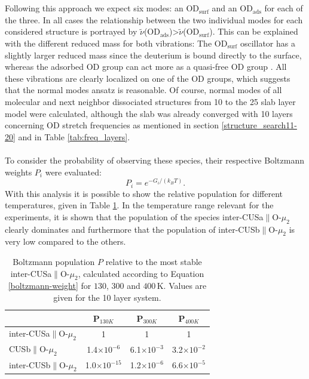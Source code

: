 \documentclass[11pt,DIV=13,BCOR=5mm,a4paper,headinclude]{scrbook}
\begin{document}
\\\\
 Following this approach we expect six modes: an OD$_\textrm{surf}$ and an OD$_\textrm{ads}$ for each of the three.
In all cases the relationship between the two individual modes for each considered structure is portrayed by $\tilde{\nu}$(OD$_\textrm{ads}$)>$\tilde{\nu}$(OD$_\textrm{surf}$).
This can be explained with the different reduced mass for both vibrations: The OD$_\textrm{surf}$ oscillator has a slightly larger reduced mass since the deuterium is bound directly to the surface, whereas the adsorbed OD group can act more as a quasi-free OD group \cite{Wirth2014}.
All these vibrations are clearly localized on one of the OD groups, which suggests that the normal modes ansatz is reasonable.
Of course, normal modes of all molecular and next neighbor dissociated structures from 10 to the 25 slab layer model were calculated, although the slab was already converged with 10 layers concerning OD stretch frequencies as mentioned in section \ref{structure_search11-20} and in Table \ref{tab:freq_layers}. 
\\
\\
To consider the probability of observing these species, their respective Boltzmann weights $P_i$ were evaluated:
\begin{equation}\label{boltzmann-weight}
 P_i=e^{-G_i/(k_BT)}.
\end{equation}
With this analysis it is possible to show the relative population for different temperatures, given in Table \ref{tab:boltzmann-pop}.
In the temperature range relevant for the experiments, it is shown that the population of the species inter-CUSa$\parallel$O-$\mu_2$ clearly dominates and furthermore that the population of inter-CUSb$\parallel$O-$\mu_2$ is very low compared to the others.
\begin{table}[th]
  \centering
 \caption{Boltzmann population $P$ relative to the most stable inter-CUSa$\parallel$O-$\mu_2$, calculated according to Equation \ref{boltzmann-weight} for $130$, $300$ and $400\,$K.
Values are given for the 10 layer system.}
\vspace*{.2cm} 
 \begin{tabular}{l|ccc}
 \toprule
  & P$_{130K}$ & P$_{300K}$ & P$_{400K}$\\\midrule
  inter-CUSa$\parallel$O-$\mu_2$ &1 &1 &1 \\
  CUSb$\parallel$O-$\mu_2$ & 1.4$\times 10^{-6}$& 6.1$\times 10^{-3}$& 3.2$\times 10^{-2}$\\
  inter-CUSb$\parallel$O-$\mu_2$ & 1.0$\times 10^{-15}$ & 1.2$\times 10^{-6}$ & 6.6$\times 10^{-5}$\\\bottomrule
  \end{tabular} 
  \label{tab:boltzmann-pop}
\end{table}
\end{document}
